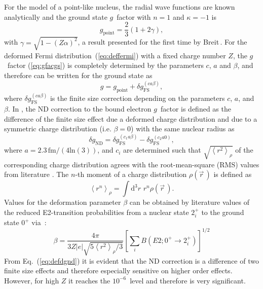For the model of a point-like nucleus, the radial wave functions are known analytically and the ground state $g$~factor with $n=1$ and $\kappa=-1$ is
\begin{equation}
g_{\text{point}} = \frac{2}{3}\left( 1 + 2 \gamma\right),
\end{equation}
with $\gamma = \sqrt{1-(Z\alpha)^2}$, a result presented for the first time by Breit$\,$\cite{breit1928}. For the deformed Fermi distribution~(\ref{eq:deffermi}) with a fixed charge number $Z$, the $g$~factor (\ref{eq:gfacgs}) is completely determined by the parameters $c$, $a$ and $\beta$, and therefore can be written for the ground state as
\begin{equation}
g = g_{\text{point}} + \delta g^{(ca\beta)}_{\text{FS}},
\end{equation}
where $\delta g^{(ca\beta)}_{\text{FS}}$ is the finite size correction depending on the parameters $c$, $a$, and $\beta$. In \cite{jacek2012}, the ND correction to the bound electron $g$~factor is defined as the difference of the finite size effect due a deformed charge distribution and due to a symmetric charge distribution (i.e. ${\beta}{=}{0}$) with the same nuclear radius as
\begin{equation}
\delta g_{\text{ND}}=\delta g^{(c_1a\beta)}_{\text{FS}} - \delta g^{(c_2a0)}_{\text{FS}},
\label{eq:defdgnd}
\end{equation}
where $a=2.3\,\text{fm}/(4\text{ln}(3))$, and $c_i$ are determined such that $\sqrt{\left<r^2\right>_{\rho}}$ of the corresponding charge distribution agrees with the root-mean-square (RMS) values from literature \cite{Angeli2013}. The $n$-th moment of a charge distribution $\rho(\vec{r}\,)$ is defined as
\begin{equation}
\left< r^n \right>_{\rho} = \int \text{d}^3r\,\, r^n \rho(\vec{r}\,).
\label{eq:nmoment}
\end{equation}
Values for the deformation parameter $\beta$ can be obtained by literature values of the reduced E2-transition probabilities from a nuclear state $2^+_i$ to the ground state $0^+$ via~\cite{Trager}:
\begin{equation}
\beta = \frac{4\pi}{3Z|e|\sqrt{5\left< r^2\right>_{\rho} /3}}\left[ \sum_i B(E2;0^+\rightarrow 2_i^+) \right]^{1/2}
\label{eq:beta}
\end{equation}
From Eq.~(\ref{eq:defdgnd}) it is evident that the ND correction is a difference of two finite size effects and therefore especially sensitive on higher order effects. However, for high $Z$ it reaches the $10^{-6}$~level and therefore is very significant.

